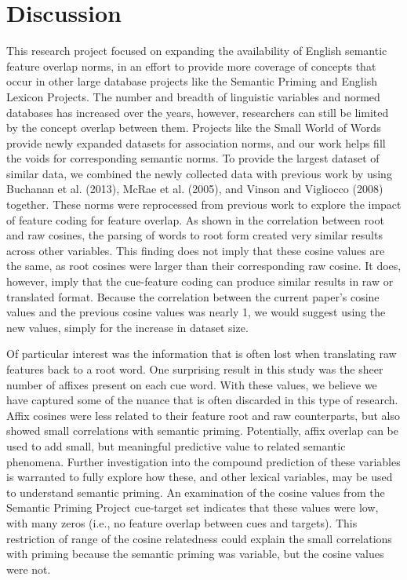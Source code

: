 \documentclass[english,,man]{apa6}
\theoremstyle{definition}
\theoremstyle{definition}
\theoremstyle{definition}
\theoremstyle{remark}
\begin{document}
\section{Discussion}\label{discussion}

This research project focused on expanding the availability of English
semantic feature overlap norms, in an effort to provide more coverage of
concepts that occur in other large database projects like the Semantic
Priming and English Lexicon Projects. The number and breadth of
linguistic variables and normed databases has increased over the years,
however, researchers can still be limited by the concept overlap between
them. Projects like the Small World of Words provide newly expanded
datasets for association norms, and our work helps fill the voids for
corresponding semantic norms. To provide the largest dataset of similar
data, we combined the newly collected data with previous work by using
Buchanan et al. (2013), McRae et al. (2005), and Vinson and Vigliocco
(2008) together. These norms were reprocessed from previous work to
explore the impact of feature coding for feature overlap. As shown in
the correlation between root and raw cosines, the parsing of words to
root form created very similar results across other variables. This
finding does not imply that these cosine values are the same, as root
cosines were larger than their corresponding raw cosine. It does,
however, imply that the cue-feature coding can produce similar results
in raw or translated format. Because the correlation between the current
paper's cosine values and the previous cosine values was nearly 1, we
would suggest using the new values, simply for the increase in dataset
size.

Of particular interest was the information that is often lost when
translating raw features back to a root word. One surprising result in
this study was the sheer number of affixes present on each cue word.
With these values, we believe we have captured some of the nuance that
is often discarded in this type of research. Affix cosines were less
related to their feature root and raw counterparts, but also showed
small correlations with semantic priming. Potentially, affix overlap can
be used to add small, but meaningful predictive value to related
semantic phenomena. Further investigation into the compound prediction
of these variables is warranted to fully explore how these, and other
lexical variables, may be used to understand semantic priming. An
examination of the cosine values from the Semantic Priming Project
cue-target set indicates that these values were low, with many zeros
(i.e., no feature overlap between cues and targets). This restriction of
range of the cosine relatedness could explain the small correlations
with priming because the semantic priming was variable, but the cosine
values were not.
\end{document}
